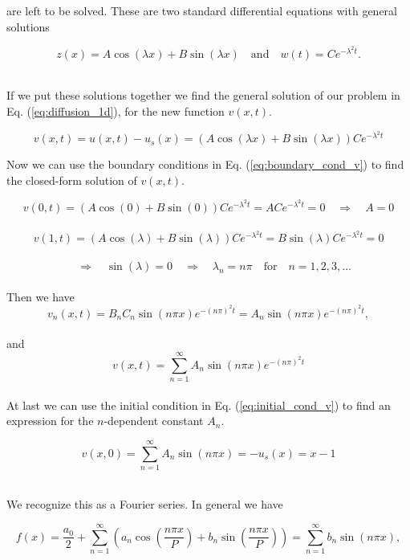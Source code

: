\documentclass[12pt]{article}
\begin{document}
\begin{flushleft}
are left to be solved. These are two standard differential equations with general solutions

\vspace{5mm}
$$z(x) = A\cos(\lambda x) + B\sin(\lambda x)\quad\text{and}\quad w(t) = Ce^{-\lambda^2 t}.$$\\
\vspace{5mm}

If we put these solutions together we find the general solution of our problem in Eq. (\ref{eq:diffusion_1d}), for the new function $v(x,t)$.

\vspace{5mm}
\begin{equation}
v(x,t) = u(x,t) - u_s(x) = \left(A\cos(\lambda x) + B\sin(\lambda x)\right)Ce^{-\lambda^2 t}
\end{equation}
\vspace{5mm}

Now we can use the boundary conditions in Eq. (\ref{eq:boundary_cond_v}) to find the closed-form solution of $v(x,t)$.

\vspace{5mm}
$$v(0,t) = \left(A\cos(0) + B\sin(0)\right)Ce^{-\lambda^2 t} = ACe^{-\lambda^2 t} = 0 \quad\Rightarrow\quad A = 0$$\\
$$v(1,t) = \left(A\cos(\lambda) + B\sin(\lambda)\right)Ce^{-\lambda^2 t} = B\sin(\lambda)Ce^{-\lambda^2 t} = 0$$\\
$$\quad\Rightarrow\quad \sin(\lambda) = 0 \quad\Rightarrow\quad \lambda_n = n\pi\quad\text{for}\quad n = 1,2,3,...$$\\
\vspace{5mm}
Then we have 
\vspace{5mm}
$$v_n(x,t) = B_nC_n\sin(n\pi x)e^{-(n\pi)^2t} = A_n\sin(n\pi x)e^{-(n\pi)^2t},$$\\
and
$$v(x,t) = \sum\limits_{n=1}^{\infty}A_n\sin(n\pi x)e^{-(n\pi)^2t}$$\\
\vspace{5mm}
At last we can use the initial condition in Eq. (\ref{eq:initial_cond_v}) to find an expression for the $n$-dependent constant $A_n$.

\vspace{5mm}
$$v(x,0) = \sum\limits_{n=1}^{\infty}A_n\sin(n\pi x) = -u_s(x) = x-1$$\\
\vspace{5mm}

We recognize this as a Fourier series. In general we have

\vspace{5mm}
\begin{equation}\label{eq:fourier_series}
f(x) = \frac{a_0}{2}+\sum\limits_{n=1}^{\infty}\left(a_n\cos\left(\frac{n\pi x}{P}\right) + b_n\sin\left(\frac{n\pi x}{P}\right)\right) = \sum\limits_{n=1}^{\infty}b_n \sin\left(n\pi x\right),
\end{equation}
\vspace{5mm}


\end{flushleft}
\end{document}
